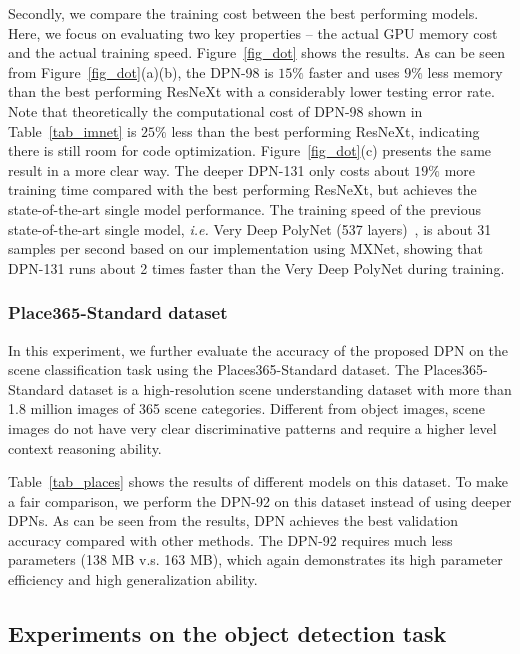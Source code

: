 \documentclass{article}
\begin{document}
\vskip -0.06in
Secondly, we compare the training cost between the best performing models. Here, we focus on evaluating two key properties -- the actual GPU memory cost and the actual training speed. Figure~\ref{fig_dot} shows the results. As can be seen from Figure~\ref{fig_dot}(a)(b), the DPN-98 is $15\%$ faster and uses $9\%$ less memory than the best performing ResNeXt with a considerably lower testing error rate. Note that theoretically the computational cost of DPN-98 shown in Table~\ref{tab_imnet} is $25\%$ less than the best performing ResNeXt, indicating there is still room for code optimization. Figure~\ref{fig_dot}(c) presents the same result in a more clear way. The deeper DPN-131 only costs about $19\%$ more training time compared with the best performing ResNeXt, but achieves the state-of-the-art single model performance. The training speed of the previous state-of-the-art single model, \emph{i.e.} Very Deep PolyNet (537 layers)~\citep{zhang2016polynet}, is about 31 samples per second based on our implementation using MXNet, showing that DPN-131 runs about 2 times faster than the Very Deep PolyNet during training.


\subsubsection{Place365-Standard dataset}

\vskip -0.04in
In this experiment, we further evaluate the accuracy of the proposed DPN on the scene classification task using the Places365-Standard dataset. The Places365-Standard dataset is a high-resolution scene understanding dataset with more than 1.8 million images of 365 scene categories. Different from object images, scene images do not have very clear discriminative patterns and require a higher level context reasoning ability.

\vskip -0.04in
Table~\ref{tab_places} shows the results of different models on this dataset. To make a fair comparison, we perform the DPN-92 on this dataset instead of using deeper DPNs. As can be seen from the results, DPN achieves the best validation accuracy compared with other methods. The DPN-92 requires much less parameters (138 MB v.s. 163 MB), which again demonstrates its high parameter efficiency and high generalization ability.


\subsection{Experiments on the object detection task}
\end{document}
